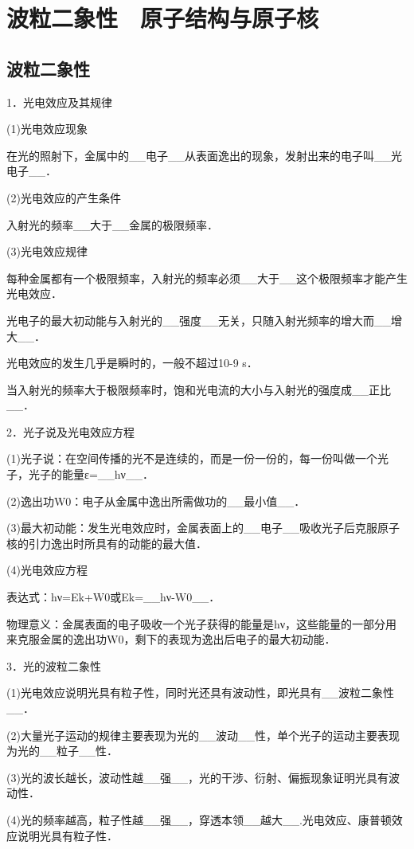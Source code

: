 \chapter{波粒二象性　原子结构与原子核}
\section{波粒二象性}

1．光电效应及其规律

(1)光电效应现象

在光的照射下，金属中的\_\_电子\_\_从表面逸出的现象，发射出来的电子叫\_\_光电子\_\_．

(2)光电效应的产生条件

入射光的频率\_\_大于\_\_金属的极限频率．

(3)光电效应规律

每种金属都有一个极限频率，入射光的频率必须\_\_大于\_\_这个极限频率才能产生光电效应．

光电子的最大初动能与入射光的\_\_强度\_\_无关，只随入射光频率的增大而\_\_增大\_\_．

光电效应的发生几乎是瞬时的，一般不超过10-9 s．

当入射光的频率大于极限频率时，饱和光电流的大小与入射光的强度成\_\_正比\_\_．

2．光子说及光电效应方程

(1)光子说：在空间传播的光不是连续的，而是一份一份的，每一份叫做一个光子，光子的能量ε=\_\_hν\_\_．

(2)逸出功W0：电子从金属中逸出所需做功的\_\_最小值\_\_．

(3)最大初动能：发生光电效应时，金属表面上的\_\_电子\_\_吸收光子后克服原子核的引力逸出时所具有的动能的最大值．

(4)光电效应方程

表达式：hν=Ek+W0或Ek=\_\_hν-W0\_\_．

物理意义：金属表面的电子吸收一个光子获得的能量是hν，这些能量的一部分用来克服金属的逸出功W0，剩下的表现为逸出后电子的最大初动能．

3．光的波粒二象性

(1)光电效应说明光具有粒子性，同时光还具有波动性，即光具有\_\_波粒二象性\_\_．

(2)大量光子运动的规律主要表现为光的\_\_波动\_\_性，单个光子的运动主要表现为光的\_\_粒子\_\_性．

(3)光的波长越长，波动性越\_\_强\_\_，光的干涉、衍射、偏振现象证明光具有波动性．

(4)光的频率越高，粒子性越\_\_强\_\_，穿透本领\_\_越大\_\_.光电效应、康普顿效应说明光具有粒子性．

